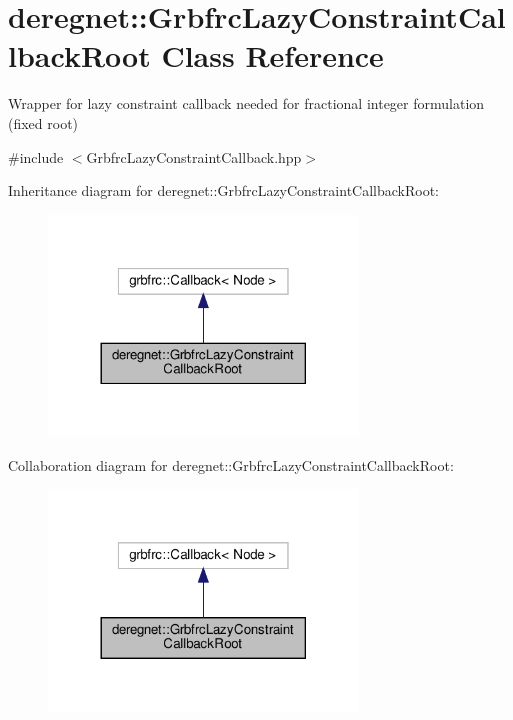 \hypertarget{classderegnet_1_1GrbfrcLazyConstraintCallbackRoot}{}\section{deregnet\+:\+:Grbfrc\+Lazy\+Constraint\+Callback\+Root Class Reference}
\label{classderegnet_1_1GrbfrcLazyConstraintCallbackRoot}


Wrapper for lazy constraint callback needed for fractional integer formulation (fixed root)  




{\ttfamily \#include $<$Grbfrc\+Lazy\+Constraint\+Callback.\+hpp$>$}



Inheritance diagram for deregnet\+:\+:Grbfrc\+Lazy\+Constraint\+Callback\+Root\+:\nopagebreak
\begin{figure}[H]
\begin{center}
\leavevmode
\includegraphics[width=233pt]{classderegnet_1_1GrbfrcLazyConstraintCallbackRoot__inherit__graph}
\end{center}
\end{figure}


Collaboration diagram for deregnet\+:\+:Grbfrc\+Lazy\+Constraint\+Callback\+Root\+:\nopagebreak
\begin{figure}[H]
\begin{center}
\leavevmode
\includegraphics[width=233pt]{classderegnet_1_1GrbfrcLazyConstraintCallbackRoot__coll__graph}
\end{center}
\end{figure}
